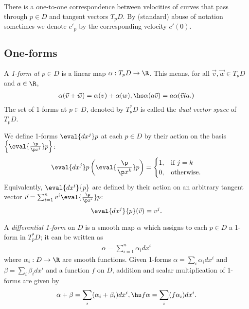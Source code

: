 \documentclass{article}
\begin{document}
\begin{corollary}
    There is a one-to-one correspondence between velocities of curves that pass through 
    $p\in D$ and tangent vectors $T_pD$. By (standard) abuse of notation sometimes 
    we denote $c'_p$ by the corresponding velocity $c'(0)$.
\end{corollary}

\subsection{One-forms}

\begin{definition}
    A \emph{1-form at $p\in D$} is a linear map $\alpha:T_pD \to \R$. This means, for all
    $\vec v, \vec w\in T_pD$ and $a\in\R$,
    \begin{align*}
        \alpha(\vec v + \vec w) = \alpha(v) + \alpha(w),\hs \alpha(a\vec v) = a\alpha(\vec v    la.)
    \end{align*}
    The set of 1-forms at $p\in D$, denoted by $T^*_p D$ is called the \emph{dual vector space} of $T_p D$.
\end{definition}

\begin{definition}
    We define 1-forms $\eval{dx^j}p$ at each $p\in D$ by their action on the basis
    $\left\lbrace\eval{\frac{\p }{\p x^i}}p\right\rbrace$:
    \begin{align*}
        \eval{dx^j}p\left(\eval{\frac{\p }{\p x^k}}p\right)= \begin{cases}
            1, &\text{if } j = k\\
            0, &\text{otherwise}.
        \end{cases}
    \end{align*}
    Equivalently, $\eval{dx^i}{p}$ are defined by their action on an arbitrary tangent vector
    $\vec v = \sum_{i=1}^n v^i\eval{\frac{\p }{\p x^i}}p$:
    \begin{align*}
        \eval{dx^j}{p}(\vec v) = v^j.
    \end{align*}
\end{definition}

\begin{definition}
    A \emph{differential 1-form} on $D$ is a smooth map $\alpha$ which assigns to each $p\in D$
    a 1-form in $T^*_pD$; it can be written as
    \begin{align*}
        \alpha = \sum_{i=1}^n\alpha_i dx^i
    \end{align*}
    where $\alpha_i:D\to\R$ are smooth functions. Given 1-forms $\alpha=\sum_i\alpha_idx^i$ and 
    $\beta=\sum_i\beta_idx^i$ and a function $f$ on $D$, addition and scalar multiplication of 
    1-forms are given by
    \begin{align*}
        \alpha + \beta = \sum_i (\alpha_i + \beta_i)dx^i,\hs f\alpha = \sum_i (f\alpha_i)dx^i.
    \end{align*}
\end{definition}
\end{document}
